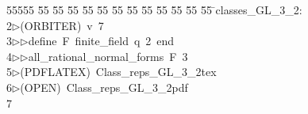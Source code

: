 %
%
\begin{tabbing}
55555 \= 55 \= 55 \= 55 \= 55 \= 55 \= 55 \= 55 \= 55 \= 55 \= 55 \= 55 \= 55 \= \>classes\_GL\_3\_2:\\[0pt]
2\>$\triangleright$\>(ORBITER)\ v\ 7\ \\[0pt]
3\>$\triangleright$\>$\triangleright$\>define\ F\ finite\_field\ q\ 2\ end\ \\[0pt]
4\>$\triangleright$\>$\triangleright$\>all\_rational\_normal\_forms\ F\ 3\ \\[0pt]
5\>$\triangleright$\>(PDFLATEX)\ Class\_reps\_GL\_3\_2tex\\[0pt]
6\>$\triangleright$\>(OPEN)\ Class\_reps\_GL\_3\_2pdf\\[0pt]
7\>\end{tabbing}
